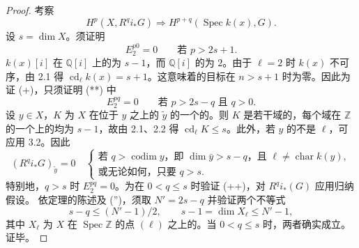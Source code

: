 \begin{proof}
考察
\begin{equation}
 H^p(X,R^qi_*G)\Longrightarrow H^{p+q}(\operatorname{Spec}k(x),G).\tag{**}
\end{equation}
设 $s=\dim X$。须证明
\begin{equation}
 E_2^{p0}=0\qquad\text{若 }p>2s+1.\tag{+}
\end{equation}
$k(x)[i]$ 在 $\mathbb Q[i]$ 上的为 $s-1$，而 $\mathbb Q[i]$ 的为 $2$。由于 $\ell=2$ 时 $k(x)$ 不可序，由 2.1 得 $\operatorname{cd}_\ell k(x)=s+1$。这意味着的目标在 $n>s+1$ 时为零。因此为证 (+)，只须证明 (**) 中
\begin{equation}
 E_2^{pq}=0\qquad\text{若 }p>2s-q\text{ 且 }q>0.\tag{++}
\end{equation}
设 $y\in X$，$K$ 为 $X$ 在位于 $y$ 之上的 $\widetilde y$ 的一个的。则 $K$ 是若干域的，每个域在 $\mathbb Z$ 的一个上的均为 $s-1$，故由 2.1、2.2 得 $\operatorname{cd}_\ell K\leq s$。此外，若 $y$ 的不是 $\ell$，可应用 3.2。因此
\begin{equation}
 (R^qi_*G)_{\widetilde y}=0\quad
 \begin{cases}
 \text{若 }q>\operatorname{codim}y\text{，即 }\dim\bar y>s-q\text{，且 }\ell\ne\operatorname{char}k(y),\\
 \text{或无论如何，只要 }q>s.
 \end{cases}\tag{''}
\end{equation}
特别地，$q>s$ 时 $E_2^{pq}=0$。为在 $0<q\leq s$ 时验证 (++)，对 $R^qi_*(G)$ 应用归纳假设。
依定理的陈述及 ('')，须取 $N'=2s-q$ 并验证两个不等式
\[
 s-q\leq(N'-1)/2,\qquad s-1=\dim X_\ell\leq N'-1,
\]
其中 $X_\ell$ 为 $X$ 在 $\operatorname{Spec}\mathbb Z$ 的点 $(\ell)$ 之上的。当 $0<q\leq s$ 时，两者确实成立。证毕。
\end{proof}

